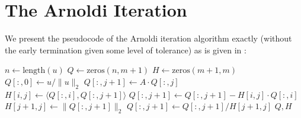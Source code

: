 \section{The Arnoldi Iteration}

We present the pseudocode of the Arnoldi iteration algorithm exactly (without the early termination given some level of tolerance) as is given in \citet{arnoldi2025lab}:

\begin{algorithm}[H]
    \begin{algorithmic}
        \State$n\gets\text{length}(u)$
        \State$Q\gets\text{zeros}(n,m+1)$
        \State$H\gets\text{zeros}(m+1,m)$
        \State$Q[:,0]\gets u/\|u\|_2$
        \State$Q[:,j+1]\gets A\cdot Q[:,j]$
        \State$H[i,j]\gets\langle Q[:,i],Q[:,j+1]\rangle$
        \State$Q[:,j+1]\gets Q[:,j+1]-H[i,j]\cdot Q[:,i]$
        \EndFor
        \State$H[j+1,j]\gets\|Q[:,j+1]\|_2$
        \State$Q[:,j+1]\gets Q[:,j+1]/H[j+1,j]$
        \EndFor
        \State\Return$Q,H$
        \EndProcedure
    \end{algorithmic}
\end{algorithm}

